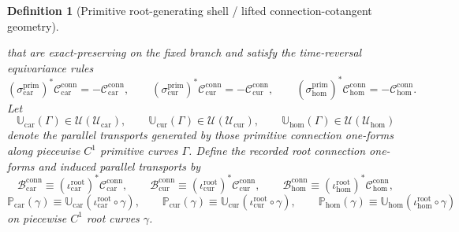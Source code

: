 \documentclass[11pt]{article}
\newcommand{\RootTensorClass}{\mathscr U_{\mathrm{car}}}
\newcommand{\RootRelabelClass}{\mathscr U_{\mathrm{cur}}}
\newcommand{\RootFreeClass}{\mathscr U_{\mathrm{hom}}}
\newcommand{\TensorRootConnectionForm}{\mathcal B_{\mathrm{car}}^{\mathrm{conn}}}
\newcommand{\CurRootConnectionForm}{\mathcal B_{\mathrm{cur}}^{\mathrm{conn}}}
\newcommand{\HomRootConnectionForm}{\mathcal B_{\mathrm{hom}}^{\mathrm{conn}}}
\newcommand{\TensorRootTransport}{\mathbb P_{\mathrm{car}}}
\newcommand{\CurRootTransport}{\mathbb P_{\mathrm{cur}}}
\newcommand{\HomRootTransport}{\mathbb P_{\mathrm{hom}}}
\newcommand{\TensorPrimitiveTimeRev}{\sigma_{\mathrm{car}}^{\mathrm{prim}}}
\newcommand{\CurPrimitiveTimeRev}{\sigma_{\mathrm{cur}}^{\mathrm{prim}}}
\newcommand{\HomPrimitiveTimeRev}{\sigma_{\mathrm{hom}}^{\mathrm{prim}}}
\newcommand{\TensorRootInc}{\iota_{\mathrm{car}}^{\mathrm{root}}}
\newcommand{\CurRootInc}{\iota_{\mathrm{cur}}^{\mathrm{root}}}
\newcommand{\HomRootInc}{\iota_{\mathrm{hom}}^{\mathrm{root}}}
\newcommand{\TensorPrimitiveConnectionForm}{\mathcal C_{\mathrm{car}}^{\mathrm{conn}}}
\newcommand{\CurPrimitiveConnectionForm}{\mathcal C_{\mathrm{cur}}^{\mathrm{conn}}}
\newcommand{\HomPrimitiveConnectionForm}{\mathcal C_{\mathrm{hom}}^{\mathrm{conn}}}
\newcommand{\TensorPrimitiveTransport}{\mathbb U_{\mathrm{car}}}
\newcommand{\CurPrimitiveTransport}{\mathbb U_{\mathrm{cur}}}
\newcommand{\HomPrimitiveTransport}{\mathbb U_{\mathrm{hom}}}
\newtheorem{definition}{Definition}
\begin{document}
\begin{definition}[Primitive root-generating shell / lifted connection-cotangent geometry]
\begin{enumerate}
\[    \]
    that are exact-preserving on the fixed branch and satisfy the time-reversal equivariance rules
    \[
    (\TensorPrimitiveTimeRev)^*\TensorPrimitiveConnectionForm=-\TensorPrimitiveConnectionForm,\qquad
    (\CurPrimitiveTimeRev)^*\CurPrimitiveConnectionForm=-\CurPrimitiveConnectionForm,\qquad
    (\HomPrimitiveTimeRev)^*\HomPrimitiveConnectionForm=-\HomPrimitiveConnectionForm.
    \]
    Let
    \[
    \TensorPrimitiveTransport(\Gamma)\in\mathcal U(\RootTensorClass),\qquad
    \CurPrimitiveTransport(\Gamma)\in\mathcal U(\RootRelabelClass),\qquad
    \HomPrimitiveTransport(\Gamma)\in\mathcal U(\RootFreeClass)
    \]
    denote the parallel transports generated by those primitive connection one-forms along piecewise \(C^1\) primitive curves \(\Gamma\). Define the recorded root connection one-forms and induced parallel transports by
    \begin{equation}
    \TensorRootConnectionForm\equiv(\TensorRootInc)^*\TensorPrimitiveConnectionForm,\qquad
    \CurRootConnectionForm\equiv(\CurRootInc)^*\CurPrimitiveConnectionForm,\qquad
    \HomRootConnectionForm\equiv(\HomRootInc)^*\HomPrimitiveConnectionForm,
    \label{eq:root_connection_from_primitive}
    \end{equation}
    \begin{equation}
    \TensorRootTransport(\gamma)\equiv\TensorPrimitiveTransport(\TensorRootInc\circ\gamma),\qquad
    \CurRootTransport(\gamma)\equiv\CurPrimitiveTransport(\CurRootInc\circ\gamma),\qquad
    \HomRootTransport(\gamma)\equiv\HomPrimitiveTransport(\HomRootInc\circ\gamma)
    \label{eq:root_transport_from_primitive}
    \end{equation}
    on piecewise \(C^1\) root curves \(\gamma\).
\end{enumerate}


\end{definition}
\end{document}
